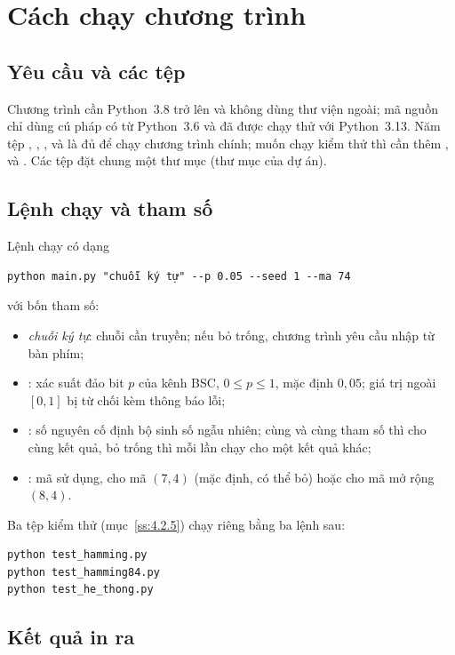 \section{Cách chạy chương trình}
\label{sec:4.5}

\subsection{Yêu cầu và các tệp}
\label{ss:4.5.1}

Chương trình cần Python~3.8 trở lên và không dùng thư viện ngoài; mã nguồn chỉ
dùng cú pháp có từ Python~3.6 và đã được chạy thử với Python~3.13. Năm tệp
, , ,
 và  là đủ để chạy chương trình chính; muốn chạy
kiểm thử thì cần thêm ,  và
. Các tệp đặt chung một
thư mục (thư mục  của dự án).

\subsection{Lệnh chạy và tham số}
\label{ss:4.5.2}

Lệnh chạy có dạng
\begin{Verbatim}
python main.py "chuỗi ký tự" --p 0.05 --seed 1 --ma 74
\end{Verbatim}
với bốn tham số:
\begin{itemize}
  \item \emph{chuỗi ký tự}: chuỗi cần truyền; nếu bỏ trống, chương trình yêu
        cầu nhập từ bàn phím;
  \item {}: xác suất đảo bit $p$ của kênh BSC, $0 \le p \le 1$, mặc
        định $0{,}05$; giá trị ngoài $[0,1]$ bị từ chối kèm thông báo lỗi;
  \item {}: số nguyên cố định bộ sinh số ngẫu nhiên; cùng
         và cùng tham số thì cho cùng kết quả, bỏ trống thì mỗi lần
        chạy cho một kết quả khác;
  \item {}: mã sử dụng,  cho mã $(7,4)$ (mặc định, có thể
        bỏ) hoặc  cho mã mở rộng $(8,4)$.
\end{itemize}
Ba tệp kiểm thử (mục~\ref{ss:4.2.5}) chạy riêng bằng ba lệnh sau:
\begin{Verbatim}
python test_hamming.py
python test_hamming84.py
python test_he_thong.py
\end{Verbatim}

\subsection{Kết quả in ra}
\label{ss:4.5.3}

